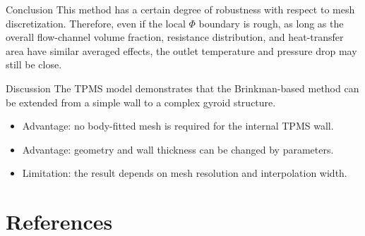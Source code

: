 \documentclass{beamer}
\begin{document}
\begin{frame}{Conclusion}
	This method has a certain degree of robustness with respect to mesh discretization. Therefore, even if the local $\Phi$ boundary is rough, as long as the overall flow-channel volume fraction, resistance distribution, and heat-transfer area have similar averaged effects, the outlet temperature and pressure drop may still be close.
\end{frame}
\begin{frame}{Discussion}
	The TPMS model demonstrates that the Brinkman-based method can be extended from a simple wall to a complex gyroid structure.
	
	\begin{itemize}
		\item Advantage: no body-fitted mesh is required for the internal TPMS wall.
		\item Advantage: geometry and wall thickness can be changed by parameters.
		\item Limitation: the result depends on mesh resolution and interpolation width.
	\end{itemize}
\end{frame}

\section{References}
	\begin{frame}[allowframebreaks]
		
		
	\end{frame}
\end{document}
